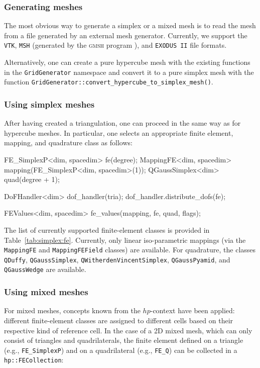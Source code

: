\documentclass{ansarticle-preprint}
\begin{document}
\subsubsection{Generating meshes}

The most obvious way to generate a simplex or a mixed mesh is to read the mesh from a file
generated by an external mesh generator. Currently, we support the
\texttt{VTK}, \texttt{MSH} (generated by the \textsc{gmsh} program \cite{geuzaine2009gmsh}), and \texttt{EXODUS II} file formats.

Alternatively, one can create a pure hypercube mesh with the existing functions
in the \texttt{GridGenerator} namespace and convert it to a
pure simplex mesh with the function
\texttt{GridGenerator::convert\_\allowbreak hypercube\_\allowbreak to\_\allowbreak simplex\_\allowbreak mesh()}.

\subsubsection{Using simplex meshes}

After having created a triangulation, one can proceed in the same way
as for hypercube meshes. In particular, one selects an appropriate finite element, mapping, and
quadrature class as follows:

\begin{c++}
FE_SimplexP<dim, spacedim> fe(degree);
MappingFE<dim, spacedim> mapping(FE_SimplexP<dim, spacedim>(1));
QGaussSimplex<dim> quad(degree + 1);

DoFHandler<dim> dof_handler(tria);
dof_handler.distribute_dofs(fe);

FEValues<dim, spacedim> fe_values(mapping, fe, quad, flags);
\end{c++}
The  list of currently supported finite-element classes is provided in Table~\ref{tab:simplex:fe}. Currently,
only linear iso-parametric mappings (via the \texttt{MappingFE} and
\texttt{MappingFEField} classes) are available.
For quadrature, the classes \texttt{QDuffy}, \texttt{QGaussSimplex}, \texttt{QWitherdenVincentSimplex},
\texttt{QGaussPyamid}, and \texttt{QGaussWedge} are
available.

\subsubsection{Using mixed meshes}
For mixed meshes, concepts known from the $hp$-context have been applied:
 different finite-element classes are assigned to different cells
 based on their respective kind of reference cell. In the
case of a 2D mixed mesh, which can only consist of triangles and
quadrilaterals, the finite element defined on a triangle (e.g., \texttt{FE\_SimplexP})
and on a quadrilateral (e.g., \texttt{FE\_Q}) can be collected in a \texttt{hp::FECollection}:
\end{document}

